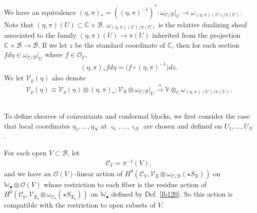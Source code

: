 \documentclass[12pt,a4paper,notitlepage]{article}
\theoremstyle{definition}
\theoremstyle{plain}
\newcommand{\fk}{\mathfrak}
\newcommand{\mc}{\mathcal}
\newcommand{\scr}{\mathscr}
\newcommand{\sgm}{\varsigma}
\newcommand{\SX}{{S_{\fk X}}}
\newcommand{\blt}{\bullet}
\newcommand{\Vbb}{\mathbb V}
\newcommand{\Wbb}{\mathbb W}
\newcommand{\Cbb}{\mathbb C}
\newcommand{\SXb}{{S_{\fk X_b}}}
\numberwithin{equation}{section}
\begin{document}
We have an equivalence $(\eta,\pi)_*=((\eta,\pi)^{-1})^*:\omega_{\mc C/\mc B}|_U\rightarrow \omega_{(\eta,\pi)(U)/\pi(U)}$. Note that $(\eta,\pi)(U)\subset \Cbb\times\mc B$. $\omega_{(\eta,\pi)(U)/\pi(U)}$ is the relative dualizing sheaf associated to the family $(\eta,\pi)(U)\rightarrow\pi(U)$ inherited from the projection $\Cbb\times\mc B\rightarrow\mc B$. If we let $z$ be the standard coordinate of $\Cbb$, then for each section $fd\eta\in\omega_{\mc C/\mc B}|_U$ where $f\in\scr O_{\mc C}$,
\begin{align*}
(\eta,\pi)_*fd\eta=\big(f\circ(\eta,\pi)^{-1}\big)dz.
\end{align*}
We let $\mc V_\varrho(\eta)$ also denote
\begin{align}
\mc V_\varrho(\eta)\equiv\mc V_\varrho(\eta)\otimes (\eta,\pi)_*:\scr V_{\fk X}\otimes\omega_{\mc C/\mc B}\big|_U\xrightarrow{\simeq} \Vbb\otimes_\Cbb\omega_{(\eta,\pi)(U)/\pi(U)}.\label{eq219}
\end{align}








\subsection{}


To define sheaves of coinvariants and conformal blocks, we first consider the case that local coordinates $\eta_1,\dots,\eta_N$ at $\sgm_1,\dots,\sgm_N$ are chosen and defined on $U_1,\dots,U_N$.

For each open $V\subset\mc B$, let \index{CV@$\mc C_V=\pi^{-1}(V)$}
\begin{align}
\mc C_V=\pi^{-1}(V),
\end{align}
and we have an $\scr O(V)$-linear action of $H^0(\mc C_V,\scr V_{\fk X}\otimes\omega_{\mc C/\mc B}(\star\SX))$ on $\Wbb_\blt\otimes\scr O(V)$ whose restriction to each fiber is the residue action of $H^0(\mc C_b,\scr V_{\fk X_b}\otimes\omega_{\mc C_b}(\star\SXb))$ on $\Wbb_\blt$ defined by Def. \ref{lb120}. So this action is compatible with the restriction to open subsets of $V$.
\end{document}
